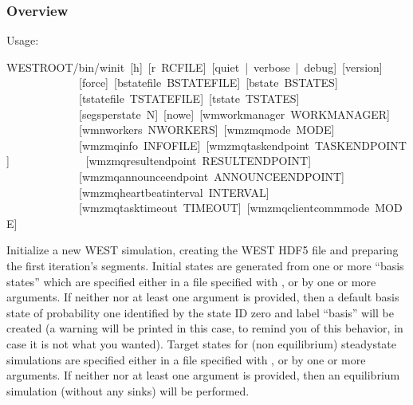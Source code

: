 \documentclass[letterpaper,10pt,english]{sphinxmanual}
\begin{document}
\subsubsection{Overview}
\label{\detokenize{users_guide/command_line_tools/w_init:overview}}
Usage:

\begin{sphinxVerbatim}[commandchars=\\\{\}]
\PYGZdl{}WEST\PYGZus{}ROOT/bin/w\PYGZus{}init [\PYGZhy{}h] [\PYGZhy{}r RCFILE] [\PYGZhy{}\PYGZhy{}quiet | \PYGZhy{}\PYGZhy{}verbose | \PYGZhy{}\PYGZhy{}debug] [\PYGZhy{}\PYGZhy{}version]
             [\PYGZhy{}\PYGZhy{}force] [\PYGZhy{}\PYGZhy{}bstate\PYGZhy{}file BSTATE\PYGZus{}FILE] [\PYGZhy{}\PYGZhy{}bstate BSTATES]
             [\PYGZhy{}\PYGZhy{}tstate\PYGZhy{}file TSTATE\PYGZus{}FILE] [\PYGZhy{}\PYGZhy{}tstate TSTATES]
             [\PYGZhy{}\PYGZhy{}segs\PYGZhy{}per\PYGZhy{}state N] [\PYGZhy{}\PYGZhy{}no\PYGZhy{}we] [\PYGZhy{}\PYGZhy{}wm\PYGZhy{}work\PYGZhy{}manager WORK\PYGZus{}MANAGER]
             [\PYGZhy{}\PYGZhy{}wm\PYGZhy{}n\PYGZhy{}workers N\PYGZus{}WORKERS] [\PYGZhy{}\PYGZhy{}wm\PYGZhy{}zmq\PYGZhy{}mode MODE]
             [\PYGZhy{}\PYGZhy{}wm\PYGZhy{}zmq\PYGZhy{}info INFO\PYGZus{}FILE] [\PYGZhy{}\PYGZhy{}wm\PYGZhy{}zmq\PYGZhy{}task\PYGZhy{}endpoint TASK\PYGZus{}ENDPOINT]
             [\PYGZhy{}\PYGZhy{}wm\PYGZhy{}zmq\PYGZhy{}result\PYGZhy{}endpoint RESULT\PYGZus{}ENDPOINT]
             [\PYGZhy{}\PYGZhy{}wm\PYGZhy{}zmq\PYGZhy{}announce\PYGZhy{}endpoint ANNOUNCE\PYGZus{}ENDPOINT]
             [\PYGZhy{}\PYGZhy{}wm\PYGZhy{}zmq\PYGZhy{}heartbeat\PYGZhy{}interval INTERVAL]
             [\PYGZhy{}\PYGZhy{}wm\PYGZhy{}zmq\PYGZhy{}task\PYGZhy{}timeout TIMEOUT] [\PYGZhy{}\PYGZhy{}wm\PYGZhy{}zmq\PYGZhy{}client\PYGZhy{}comm\PYGZhy{}mode MODE]
\end{sphinxVerbatim}

Initialize a new WEST simulation, creating the WEST HDF5 file and preparing the
first iteration’s segments. Initial states are generated from one or more
“basis states” which are specified either in a file specified with
, or by one or more  arguments. If neither
 nor at least one  argument is provided, then a
default basis state of probability one identified by the state ID zero and
label “basis” will be created (a warning will be printed in this case, to
remind you of this behavior, in case it is not what you wanted). Target states
for (non\sphinxhyphen{} equilibrium) steady\sphinxhyphen{}state simulations are specified either in a file
specified with , or by one or more  arguments. If
neither  nor at least one  argument is provided,
then an equilibrium simulation (without any sinks) will be performed.
\end{document}
